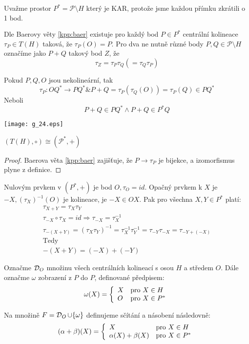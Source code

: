 \begin{definition}\label{kpp:sum_operation}
	Uvažme prostor $P^* = \mathcal{P}\setminus H$ který je KAR, protože jsme každou přímku zkrátili o 1 bod.

    Dle Baerovy věty \cref{kpp:baer} existuje pro každý bod $P \in P^*$ centrální kolineace $\tau_P\in T(H)$ taková, že $\tau_P(O)=P$.
    Pro dva ne nutně různé body $P,Q\in\mathcal{P}\setminus H$ označíme jako $P+Q$ takový bod $Z$, že
    \[ \tau_Z=\tau_P\tau_Q(=\tau_Q\tau_P) \]
\end{definition}

\begin{observation}
	Pokud $P, Q, O$ jsou nekolineární, tak
	\[ \tau_P: OQ^* \to PQ^* \& P + Q = \tau_P (\tau_Q(O)) = \tau_P(Q) \in PQ^* \]
	Neboli
	\[ P + Q \in PQ^* \land P + Q \in P^*Q \]

    \texttt{[image: g\_24.eps]}
\end{observation}

\begin{theorem}
    $(T(H),\circ)\cong(\mathcal{P}^*,+)$
\end{theorem}
\begin{proof}
    Baerova věta \cref{kpp:baer} zajišťuje, že $P\rightarrow \tau_P$ je bijekce, a izomorfismus plyne z definice.
\end{proof}

\begin{note}
	Nulovým prvkem v $(P^*, +)$ je bod $O, \tau_O = id$.
	Opačný prvkem k $X$ je $-X, (\tau_X)^{-1}(O)$ je kolineace, je $-X \in OX$.
	Pak pro všechna $X, Y \in P^*$ platí:
	\begin{gather*}
		\tau_{X + Y} = \tau_X \tau_Y\\
    		\tau_{-X} \circ \tau_X = id \Rightarrow \tau_{-X} = \tau_X^{-1}\\
		\tau_{-(X + Y)} = (\tau_X \tau_Y)^{-1} = \tau_X^{-1} \tau_Y^{-1} = \tau_{-Y}\tau_{-X} = \tau_{-Y + (-X)}\\
		\text{Tedy}\\
		-(X + Y) = (-X) + (-Y)
	\end{gather*}
\end{note}

\begin{definition}
    Označme $\operatorname{\mathcal{D}}_O$ množinu všech centrálních kolineací s osou $H$ a středem $O$.
    Dále označme $\omega$ zobrazení z $P$ do $P$, definované předpisem:
    \[ \omega(X) = \left\{ \begin{array}{ll} X & \mbox{pro } X \in H \\ O & \mbox{pro } X \in P^* \end{array} \right. \]

    Na množině $F=\operatorname{\mathcal{D}}_O\cup\{\omega\}$ definujeme sčítání a násobení následovně:
    \[ (\alpha+\beta)(X) = \left\{ \begin{array}{ll} X & \mbox{pro } X \in H \\ \alpha(X)+\beta(X) & \mbox{pro } X \in P^* \end{array} \right. \]
\end{definition}

